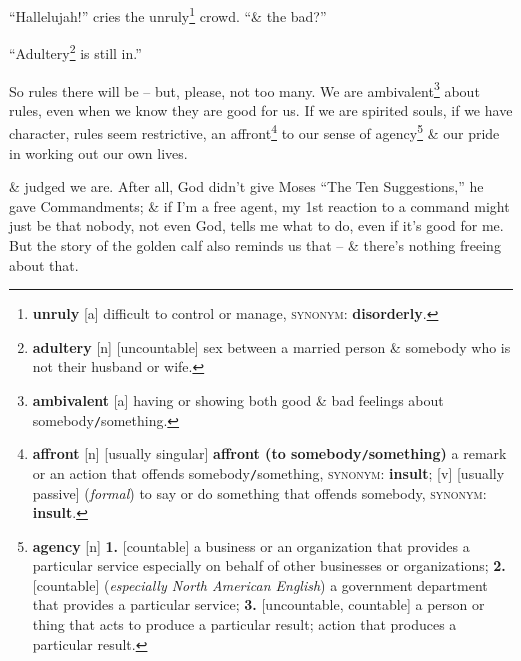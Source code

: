 \documentclass[oneside]{book}
\numberwithin{equation}{section}
\begin{document}
``Hallelujah!'' cries the unruly\footnote{\textbf{unruly} [a] difficult to control or manage, \textsc{synonym}: \textbf{disorderly}.} crowd. ``\& the bad?''

``Adultery\footnote{\textbf{adultery} [n] [uncountable] sex between a married person \& somebody who is not their husband or wife.} is still in.''

So rules there will be -- but, please, not too many. We are ambivalent\footnote{\textbf{ambivalent} [a] having or showing both good \& bad feelings about somebody\texttt{/}something.} about rules, even when we know they are good for us. If we are spirited souls, if we have character, rules seem restrictive, an affront\footnote{\textbf{affront} [n] [usually singular] \textbf{affront (to somebody\texttt{/}something)} a remark or an action that offends somebody\texttt{/}something, \textsc{synonym}: \textbf{insult}; [v] [usually passive] (\textit{formal}) to say or do something that offends somebody, \textsc{synonym}: \textbf{insult}.} to our sense of agency\footnote{\textbf{agency} [n] \textbf{1.} [countable] a business or an organization that provides a particular service especially on behalf of other businesses or organizations; \textbf{2.} [countable] (\textit{especially North American English}) a government department that provides a particular service; \textbf{3.} [uncountable, countable] a person or thing that acts to produce a particular result; action that produces a particular result.} \& our pride in working out our own lives. 

\& judged we are. After all, God didn't give Moses ``The Ten Suggestions,'' he gave Commandments; \& if I'm a free agent, my 1st reaction to a command might just be that nobody, not even God, tells me what to do, even if it's good for me. But the story of the golden calf also reminds us that  -- \& there's nothing freeing about that.
\end{document}
